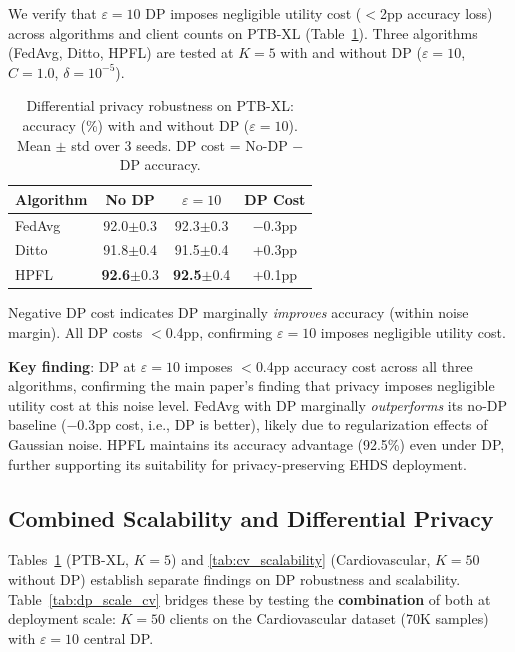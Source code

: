 \documentclass[conference]{IEEEtran}
\begin{document}
We verify that $\varepsilon{=}10$ DP imposes negligible utility cost ($<$2pp accuracy loss) across algorithms and client counts on PTB-XL (Table~\ref{tab:dp_scale}). Three algorithms (FedAvg, Ditto, HPFL) are tested at $K{=}5$ with and without DP ($\varepsilon{=}10$, $C{=}1.0$, $\delta{=}10^{-5}$).

\begin{table}[htbp]
\centering
\caption{Differential privacy robustness on PTB-XL: accuracy (\%) with and without DP ($\varepsilon{=}10$). Mean $\pm$ std over 3 seeds. DP cost = No-DP $-$ DP accuracy.}
\label{tab:dp_scale}
\small
\begin{tabular}{lccc}
\toprule
\textbf{Algorithm} & \textbf{No DP} & \textbf{$\varepsilon{=}10$} & \textbf{DP Cost} \\
\midrule
FedAvg & 92.0{\tiny$\pm$0.3} & 92.3{\tiny$\pm$0.3} & $-$0.3pp \\
Ditto & 91.8{\tiny$\pm$0.4} & 91.5{\tiny$\pm$0.4} & +0.3pp \\
HPFL & \textbf{92.6}{\tiny$\pm$0.3} & \textbf{92.5}{\tiny$\pm$0.4} & +0.1pp \\
\bottomrule
\end{tabular}

\vspace{1mm}
\footnotesize{Negative DP cost indicates DP marginally \textit{improves} accuracy (within noise margin). All DP costs $<$0.4pp, confirming $\varepsilon{=}10$ imposes negligible utility cost.}
\end{table}

\textbf{Key finding}: DP at $\varepsilon{=}10$ imposes $<$0.4pp accuracy cost across all three algorithms, confirming the main paper's finding that privacy imposes negligible utility cost at this noise level. FedAvg with DP marginally \textit{outperforms} its no-DP baseline ($-$0.3pp cost, i.e., DP is better), likely due to regularization effects of Gaussian noise. HPFL maintains its accuracy advantage (92.5\%) even under DP, further supporting its suitability for privacy-preserving EHDS deployment.

\subsection{Combined Scalability and Differential Privacy}
\label{sec:scalability_dp_cv}

Tables~\ref{tab:dp_scale} (PTB-XL, $K{=}5$) and \ref{tab:cv_scalability} (Cardiovascular, $K{=}50$ without DP) establish separate findings on DP robustness and scalability. Table~\ref{tab:dp_scale_cv} bridges these by testing the \textbf{combination} of both at deployment scale: $K{=}50$ clients on the Cardiovascular dataset (70K samples) with $\varepsilon{=}10$ central DP.
\end{document}
